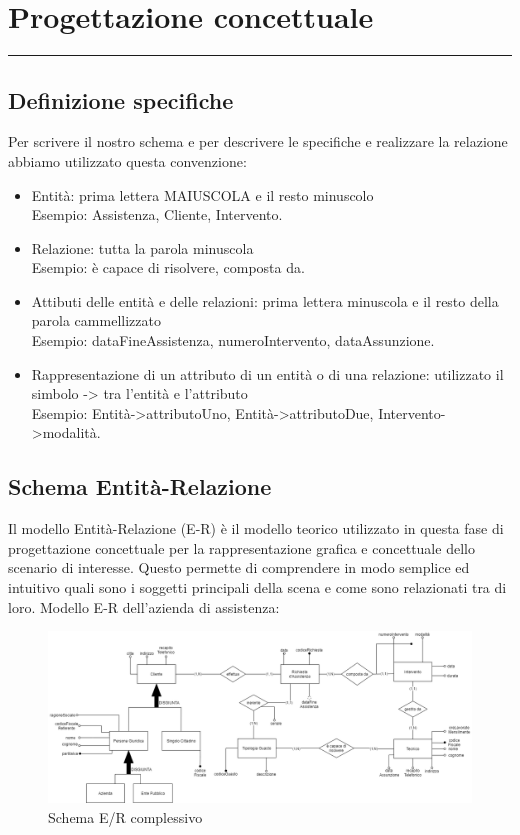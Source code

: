 \documentclass[legalpaper]{article}
\begin{document}
\newpage
\section{Progettazione concettuale}
\rule{\linewidth}{1.5pt}

\subsection{Definizione specifiche}
Per scrivere il nostro schema e per descrivere le specifiche e realizzare la relazione abbiamo utilizzato questa convenzione:
\begin{itemize}
	\item Entità: prima lettera MAIUSCOLA e il resto minuscolo\\
	Esempio: Assistenza, Cliente, Intervento.
	\item Relazione: tutta la parola minuscola\\
	Esempio: è capace di risolvere, composta da.
	\item Attibuti delle entità e delle relazioni: prima lettera minuscola e il resto della parola cammellizzato\\
	Esempio: dataFineAssistenza, numeroIntervento, dataAssunzione.
	\item Rappresentazione di un attributo di un entità o di una relazione: utilizzato il simbolo      ->      tra l'entità e l'attributo\\
	Esempio: Entità->attributoUno, Entità->attributoDue, Intervento->modalità.
\end{itemize}

\subsection{Schema Entità-Relazione}
Il modello Entità-Relazione (E-R) è il modello teorico utilizzato in questa fase di progettazione concettuale per la rappresentazione grafica e concettuale dello scenario di interesse. Questo permette di comprendere in modo semplice ed intuitivo quali sono i soggetti principali della scena e come sono relazionati tra di loro. 
Modello E-R dell'azienda di assistenza:
\newline

\begin{figure}[ht]
	\centering
	\includegraphics[width=1.1\linewidth]{image/schema_er.png}
	\caption[]{Schema E/R complessivo}
	\label{fig:erprototipov2}
\end{figure}
\end{document}
